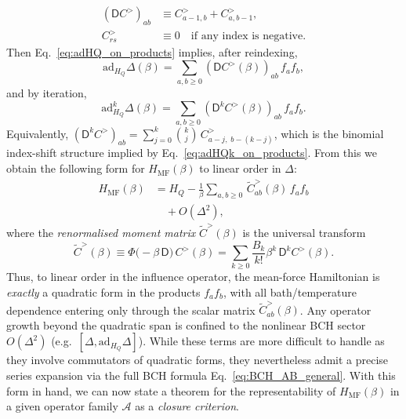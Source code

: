\begin{equation}
    \label{eq:D_operator_on_C}
    \begin{split}
        (\mathsf D C^{>})_{ab} & \equiv C^{>}_{a-1,b}+C^{>}_{a,b-1},                    \\
        C^{>}_{rs}             & \equiv 0\quad \text{if any index is negative}.
    \end{split}
\end{equation}
Then Eq.~\eqref{eq:adHQ_on_products} implies, after reindexing,
\begin{equation}
    \label{eq:adHQ_Delta_as_D_on_C}
    \mathrm{ad}_{H_Q}\Delta(\beta)
    =\sum_{a,b\ge0}(\mathsf D C^{>}(\beta))_{ab}\, f_a f_b,
\end{equation}
and by iteration,
\begin{equation}
    \label{eq:adHQk_Delta_as_Dk_on_C}
    \mathrm{ad}_{H_Q}^{k}\Delta(\beta)
    =\sum_{a,b\ge0}(\mathsf D^{k} C^{>}(\beta))_{ab}\, f_a f_b.
\end{equation}
Equivalently, $(\mathsf D^{k}C^{>})_{ab}=\sum_{j=0}^{k}\binom{k}{j}\,C^{>}_{a-j,\;b-(k-j)}$, which is the binomial
index-shift structure implied by Eq.~\eqref{eq:adHQk_on_products}. From this we obtain the following form for $H_{\mathrm{MF}}(\beta)$ to linear order in $\Delta$:
\begin{equation}
    \begin{split}
        H_{\mathrm{MF}}(\beta) &= H_Q-\frac{1}{\beta}\sum_{a,b\ge0}\,\widetilde C^{>}_{ab}(\beta)\, f_a f_b \\
        &\quad + O(\Delta^2),
    \end{split}
    \label{eq:HMF_linear_quadratic_final}
\end{equation}
where the \emph{renormalised moment matrix} $\widetilde C^{>}(\beta)$ is the universal transform
\begin{equation}
    \label{eq:Ctilde_def}
    \widetilde C^{>}(\beta) \equiv \Phi\!\big(-\beta\,\mathsf D\big)\,C^{>}(\beta)
    = \sum_{k\ge0}\frac{B_k}{k!}\beta^k\,\mathsf D^{k}C^{>}(\beta).
\end{equation}
Thus, to linear order in the influence operator, the mean-force Hamiltonian is \emph{exactly} a quadratic
form in the products $f_af_b$, with all bath/temperature dependence entering only through the scalar matrix
$\widetilde C^{>}_{ab}(\beta)$.
 Any operator growth beyond the quadratic span is confined to the nonlinear BCH sector $O(\Delta^2)$ (e.g.\
$[\Delta,\mathrm{ad}_{H_Q}\Delta]$). While these terms are more difficult to handle as they involve commutators of quadratic forms, they nevertheless admit a precise series expansion via the full BCH formula Eq.~\eqref{eq:BCH_AB_general}. With this form in hand, we can now state a theorem for the representability of $H_{\mathrm{MF}}(\beta)$ in a given operator family $\mathcal A$ as a \emph{closure criterion}.

